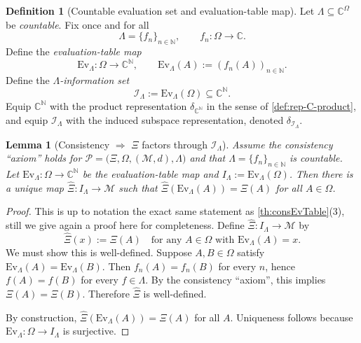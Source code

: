 \documentclass{lmcs} %
\theoremstyle{plain}
\theoremstyle{plain}
\newtheorem{lemma}[theorem]{Lemma}
\theoremstyle{definition}
\newtheorem{definition}[theorem]{Definition}
\theoremstyle{remark}
\theoremstyle{definition}
\theoremstyle{remark}
\numberwithin{equation}{section}
\newcommand{\N}{\mathbb{N}}
\newcommand{\C}{\mathbb{C}}
\begin{document}
\begin{definition}[Countable evaluation set and evaluation-table map]\label{def:countable-Lambda}
Let $\Lambda\subseteq\C^\Omega$ be \textit{countable}. Fix once and for all
\[
\Lambda=\{f_n\}_{n\in\N},\qquad f_n:\Omega\to\C.
\]
Define the \textit{evaluation-table map}
\[
\mathrm{Ev}_\Lambda:\Omega\to \C^\N,\qquad \mathrm{Ev}_\Lambda(A):=(f_n(A))_{n\in\N}.
\]
Define the \textit{$\Lambda$-information set}
\[
\mathcal{I}_\Lambda:=\mathrm{Ev}_\Lambda(\Omega)\subseteq \C^\N.
\]
Equip $\C^\N$ with the product representation $\delta_{\C^\N}$ in the sense of \cref{def:rep-C-product},
and equip $\mathcal{I}_\Lambda$ with the induced subspace representation, denoted $\delta_{\mathcal{I}_\Lambda}$.
\end{definition}

\begin{lemma}[Consistency $\Rightarrow$ $\Xi$ factors through $\mathcal{I}_\Lambda$]\label{lem:factor}
Assume the consistency \enquote{axiom} holds for $\mathcal{P}=\bigl( \Xi,\Omega,(\mathcal{M},d),\Lambda \bigr)$ and that
$\Lambda=\{f_n\}_{n\in\mathbb{N}}$ is countable. Let $\mathrm{Ev}_\Lambda:\Omega\to\mathbb{C}^{\mathbb{N}}$
be the evaluation-table map and $I_\Lambda:=\mathrm{Ev}_\Lambda(\Omega)$.
Then there is a unique map $\widehat{\Xi}:I_\Lambda\to \mathcal{M}$ such that
$\widehat{\Xi}(\mathrm{Ev}_\Lambda(A))=\Xi(A)$ for all $A\in\Omega$.
\end{lemma}

\begin{proof}
This is up to notation the exact same statement as \cref{th:consEvTable}(3), still we give again a proof here for completeness. Define $\widehat{\Xi}:I_\Lambda\to \mathcal{M}$ by
\[
\widehat{\Xi}(x):=\Xi(A)\quad\text{for any }A\in\Omega\text{ with }\mathrm{Ev}_\Lambda(A)=x.
\]
We must show this is well-defined. Suppose $A,B\in\Omega$ satisfy
$\mathrm{Ev}_\Lambda(A)=\mathrm{Ev}_\Lambda(B)$. Then $f_n(A)=f_n(B)$ for every $n$,
hence $f(A)=f(B)$ for every $f\in\Lambda$. By the consistency \enquote{axiom}, this implies
$\Xi(A)=\Xi(B)$. Therefore $\widehat{\Xi}$ is well-defined.

By construction, $\widehat{\Xi}(\mathrm{Ev}_\Lambda(A))=\Xi(A)$ for all $A$.
Uniqueness follows because $\mathrm{Ev}_\Lambda:\Omega\to I_\Lambda$ is surjective.
\end{proof}
\end{document}
